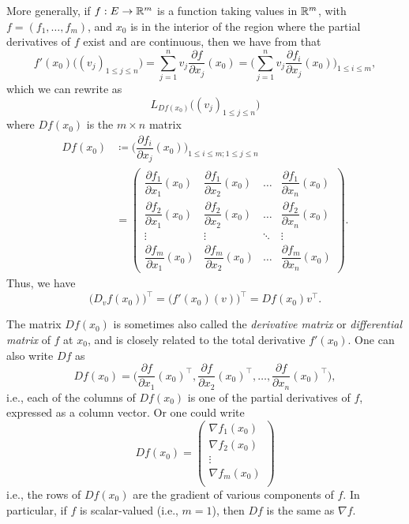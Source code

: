\begin{ac}\label{ii:ac:6.3.4}
  More generally, if \(f : E \to \mathbb{R}^m\) is a function taking values in \(\mathbb{R}^m\), with \(f = (f_1, \dots, f_m)\), and \(x_0\) is in the interior of the region where the partial derivatives of \(f\) exist and are continuous, then we have from  that
  \[
    f'(x_0)\big((v_j)_{1 \leq j \leq n}\big) = \sum_{j = 1}^n v_j \dfrac{\partial f}{\partial x_j}(x_0) = \bigg(\sum_{j = 1}^n v_j \dfrac{\partial f_i}{\partial x_j}(x_0)\bigg)_{1 \leq i \leq m},
  \]
  which we can rewrite as
  \[
    L_{D f(x_0)}\big((v_j)_{1 \leq j \leq n}\big)
  \]
  where \(D f(x_0)\) is the \(m \times n\) matrix
  \begin{align*}
    D f(x_0) & \coloneqq \bigg(\dfrac{\partial f_i}{\partial x_j}(x_0)\bigg)_{1 \leq i \leq m ; 1 \leq j \leq n}                                      \\
             & = \begin{pmatrix}
                   \dfrac{\partial f_1}{\partial x_1}(x_0) & \dfrac{\partial f_1}{\partial x_2}(x_0) & \dots  & \dfrac{\partial f_1}{\partial x_n}(x_0) \\
                   \dfrac{\partial f_2}{\partial x_1}(x_0) & \dfrac{\partial f_2}{\partial x_2}(x_0) & \dots  & \dfrac{\partial f_2}{\partial x_n}(x_0) \\
                   \vdots                                  & \vdots                                  & \ddots & \vdots                                  \\
                   \dfrac{\partial f_m}{\partial x_1}(x_0) & \dfrac{\partial f_m}{\partial x_2}(x_0) & \dots  & \dfrac{\partial f_m}{\partial x_n}(x_0)
                 \end{pmatrix}.
  \end{align*}
  Thus, we have
  \[
    \big(D_v f(x_0)\big)^\top = \big(f'(x_0)(v)\big)^\top = D f(x_0) v^\top.
  \]

  The matrix \(D f(x_0)\) is sometimes also called the \emph{derivative matrix} or \emph{differential matrix} of \(f\) at \(x_0\), and is closely related to the total derivative \(f'(x_0)\).
  One can also write \(Df\) as
  \[
    D f(x_0) = \bigg(\dfrac{\partial f}{\partial x_1}(x_0)^\top, \dfrac{\partial f}{\partial x_2}(x_0)^\top, \dots, \dfrac{\partial f}{\partial x_n}(x_0)^\top\bigg),
  \]
  i.e., each of the columns of \(D f(x_0)\) is one of the partial derivatives of \(f\), expressed as a column vector.
  Or one could write
  \[
    D f(x_0) = \begin{pmatrix}
      \nabla f_1(x_0) \\
      \nabla f_2(x_0) \\
      \vdots          \\
      \nabla f_m(x_0) \\
    \end{pmatrix}
  \]
  i.e., the rows of \(D f(x_0)\) are the gradient of various components of \(f\).
  In particular, if \(f\) is scalar-valued (i.e., \(m = 1\)), then \(Df\) is the same as \(\nabla f\).
\end{ac}

